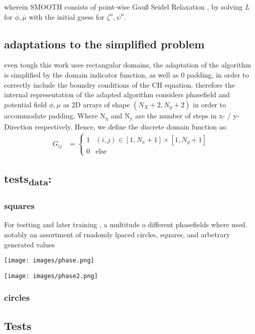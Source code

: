\documentclass[11pt]{article}
\begin{document}
wherein SMOOTH consists of point-wise Gauß Seidel Relaxation , by solving \emph{L} for \(\overline{\phi} ,\overline{\mu}\) with the initial guess for \(\zeta^n , \psi^n\).
\subsection{adaptations to the simplified problem}
\label{sec:orgb861ceb}
even tough this work uses rectangular domains, the adaptation of the algorithm is simplified by the domain indicator function, as well as 0 padding, in order to correctly include the boundry conditions of the CH equation.
therefore the internal representation of the adapted algorithm considers phasefield and potential field \(\phi , \mu\) as 2D arrays of shape \((N_X + 2 , N_y + 2)\) in order to accommodate padding. Where N\textsubscript{x} and N\textsubscript{y} are the number of steps in x- / y-Direction respectively.
Hence, we define the discrete domain function as:
\begin{align*}
G_{ij} &=
\begin{cases}
1 & (i,j) \in  [1,N_x+1] \times  [1,N_y+1] \\
0 & \text{else}
\end{cases}
\end{align*}
\subsection{tests\textsubscript{data}:}
\label{sec:org6c0ca52}
\subsubsection{squares}
\label{sec:org6e94b83}
For testting and later training , a multitude o different phasefields where used. notably an assortment of rnadomly lpaced circles, squares, and arbetrary generated values
\begin{center}
\texttt{[image: images/phase.png]}
\end{center}



\begin{center}
\texttt{[image: images/phase2.png]}
\end{center}
\subsubsection{circles}
\label{sec:orgf461398}
\subsection{Tests}
\label{sec:org567d6f3}
\end{document}

